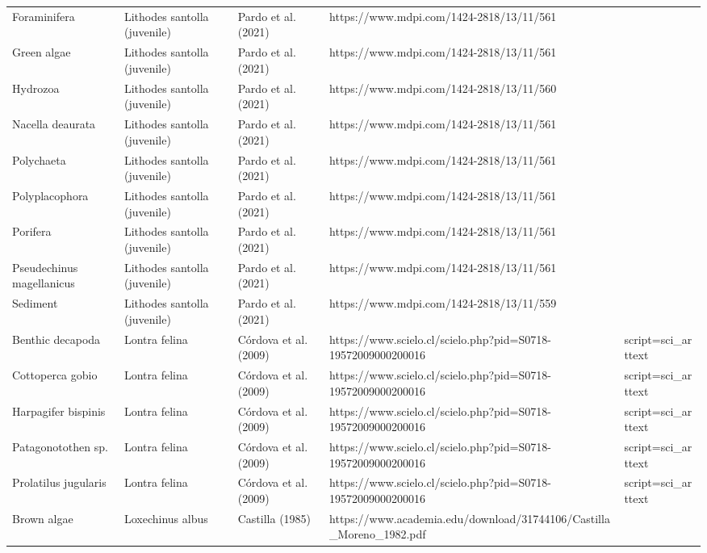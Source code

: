 \documentclass[
]{article}
\begin{document}
\begin{landscape}
\begin{longtable}[t]{>{\raggedright\arraybackslash}p{4cm}>{\centering\arraybackslash}p{4cm}>{\centering\arraybackslash}p{6cm}>{\centering\arraybackslash}p{6cm}}
Foraminifera & Lithodes santolla (juvenile) & \tiny Pardo et al.(2021) & \tiny https://www.mdpi.com/1424-2818/13/11/561\\
Green algae & Lithodes santolla (juvenile) & \tiny Pardo et al.(2021) & \tiny https://www.mdpi.com/1424-2818/13/11/561\\
\addlinespace
Hydrozoa & Lithodes santolla (juvenile) & \tiny Pardo et al.(2021) & \tiny https://www.mdpi.com/1424-2818/13/11/560\\
Nacella deaurata & Lithodes santolla (juvenile) & \tiny Pardo et al.(2021) & \tiny https://www.mdpi.com/1424-2818/13/11/561\\
Polychaeta & Lithodes santolla (juvenile) & \tiny Pardo et al.(2021) & \tiny https://www.mdpi.com/1424-2818/13/11/561\\
Polyplacophora & Lithodes santolla (juvenile) & \tiny Pardo et al.(2021) & \tiny https://www.mdpi.com/1424-2818/13/11/561\\
Porifera & Lithodes santolla (juvenile) & \tiny Pardo et al.(2021) & \tiny https://www.mdpi.com/1424-2818/13/11/561\\
\addlinespace
Pseudechinus magellanicus & Lithodes santolla (juvenile) & \tiny Pardo et al.(2021) & \tiny https://www.mdpi.com/1424-2818/13/11/561\\
Sediment & Lithodes santolla (juvenile) & \tiny Pardo et al.(2021) & \tiny https://www.mdpi.com/1424-2818/13/11/559\\
Benthic decapoda & Lontra felina & \tiny Córdova et al. (2009) & \tiny https://www.scielo.cl/scielo.php?pid=S0718-19572009000200016&script=sci_arttext\\
Cottoperca gobio & Lontra felina & \tiny Córdova et al. (2009) & \tiny https://www.scielo.cl/scielo.php?pid=S0718-19572009000200016&script=sci_arttext\\
Harpagifer bispinis & Lontra felina & \tiny Córdova et al. (2009) & \tiny https://www.scielo.cl/scielo.php?pid=S0718-19572009000200016&script=sci_arttext\\
\addlinespace
Patagonotothen sp. & Lontra felina & \tiny Córdova et al. (2009) & \tiny https://www.scielo.cl/scielo.php?pid=S0718-19572009000200016&script=sci_arttext\\
Prolatilus jugularis & Lontra felina & \tiny Córdova et al. (2009) & \tiny https://www.scielo.cl/scielo.php?pid=S0718-19572009000200016&script=sci_arttext\\
Brown algae & Loxechinus albus & \tiny Castilla (1985) & \tiny https://www.academia.edu/download/31744106/Castilla_Moreno_1982.pdf\\

\end{longtable}
\end{landscape}
\end{document}
